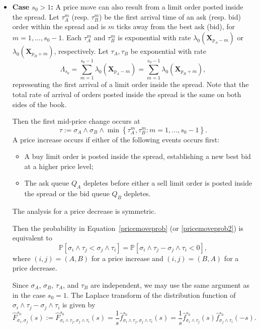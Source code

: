 \documentclass[11pt]{article}
\newenvironment{proof}{\noindent{\it Proof.}}{\hfill\fbox{}\vspace*{1mm}}
\begin{document}
\begin{proof}
\begin{itemize}
\item[\textbf{(ii)}] \textbf{Case \( s_0 > 1 \):}
A price move can also result from a limit order posted inside the spread. Let $\tau_A^m$ (resp. $\tau_B^m$) be the first arrival time of an ask (resp. bid) order within the spread and is $m$ ticks away from the best ask (bid), for $m=1,...,s_0-1$. Each $\tau_A^m$ and $\tau_B^m$ is exponential with rate $\lambda_0(\boldsymbol{X}_{p_A - m})$ or $\lambda_0(\boldsymbol{X}_{p_B + m})$, respectively. Let $\tau_A, \tau_B$ be exponential with rate
\[
\Lambda_{s_0} = \sum_{m=1}^{s_0 - 1} \lambda_0(\boldsymbol{X}_{p_A - m}) = \sum_{m=1}^{s_0 - 1} \lambda_0(\boldsymbol{X}_{p_B + m}),
\]
representing the first arrival of a limit order inside the spread. Note that the total rate of arrival of orders posted inside the spread is the same on both sides of the book.

Then the first mid-price change occurs at
\begin{equation*}\label{probspread}
    \tau := \sigma_A \wedge \sigma_B \wedge \min \left\{ \tau_A^m, \tau_B^m : m = 1, \dots, s_0 - 1 \right\}.
\end{equation*}
A price increase occurs if either of the following events occurs first:
\begin{itemize}
    \item A buy limit order is posted inside the spread, establishing a new best bid at a higher price level;
    \item The ask queue $Q_A$ depletes before either a sell limit order is posted inside the spread or the bid queue $Q_B$ depletes.
\end{itemize}
The analysis for a price decrease is symmetric.

Then the probability in Equation~\eqref{pricemoveprob} (or \eqref{pricemoveprob2}) is equivalent to
\begin{equation}\label{increaseprobspread}
    \mathbb{P}[\sigma_i \wedge \tau_j < \sigma_j \wedge \tau_i] = \mathbb{P}[\sigma_i \wedge \tau_j - \sigma_j \wedge \tau_i < 0],
\end{equation}
where $(i, j) = (A, B)$ for a price increase and $(i, j) = (B, A)$ for a price decrease.

Since $\sigma_A$, $\sigma_B$, $\tau_A$, and $\tau_B$ are independent, we may use the same argument as in the case $s_0 = 1$. The Laplace transform of the distribution function of $\sigma_i \wedge \tau_j - \sigma_j \wedge \tau_i$ is given by
\begin{equation}\label{part1}
    \hat{F}_{\sigma_i,\sigma_j}^{s_0}(s):=\hat{F}_{{\sigma_{i}\wedge\tau_j}, {\sigma_j\wedge\tau_i}}^{s_0}(s)=\frac{1}{s}\hat{f}^{s_0}_{{\sigma_{i}\wedge\tau_j}, {\sigma_j\wedge\tau_i}}(s)=\frac{1}{s}\hat{f}_{{\sigma_{i}\wedge\tau_j}}^{s_0}(s)\hat{f}_{\sigma_j\wedge\tau_i}^{s_0}(-s).
\end{equation}


\end{itemize}
\end{proof}
\end{document}
